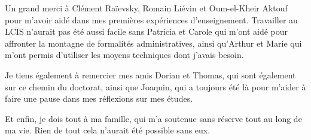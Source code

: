 Un grand merci à Clément Raïevsky, Romain Liévin et Oum-el-Kheir Aktouf pour m’avoir aidé dans mes premières expériences d’enseignement. Travailler au LCIS n’aurait pas été aussi facile sans Patricia et Carole qui m'ont aidé pour affronter la montagne de formalités administratives, ainsi qu'Arthur et Marie qui m'ont permis d'utiliser les moyens techniques dont j'avais besoin.

Je tiens également à remercier mes amis Dorian et Thomas, qui sont également sur ce chemin du doctorat, ainsi que Joaquin, qui a toujours été là pour m’aider à faire une pause dans mes réflexions sur mes études.

Et enfin, je dois tout à ma famille, qui m’a soutenue sans réserve tout au long de ma vie. Rien de tout cela n’aurait été possible sans eux.


\endgroup



